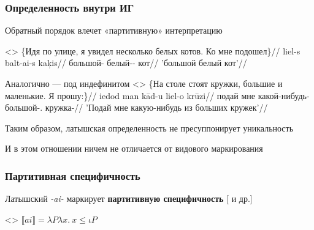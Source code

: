 \documentclass[9pt, t]{beamer}
\begin{document}
\begin{frame}
    \frametitle{Определенность внутри ИГ}

    Обратный порядок влечет «партитивную» интерпретацию

    \ex<>
        \begingl
            \glpreamble \{Идя по улице, я увидел несколько белых котов. Ко мне подошел\}//
            \gla liel-s balt-ai-s kaķis//
            \glb большой-\Nom{} белый-\Def-\Nom{} кот//
            \glft 'большой белый кот'//
        \endgl
    \xe

    \pause
    Аналогично — под индефинитом
    \ex<>
        \begingl
            \glpreamble \{На столе стоят кружки, большие и маленькие. Я прошу:\}//
            \gla iedod man kād-u liel-o krūzi//
            \glb подай мне какой-нибудь-\Acc{} большой-\Def{}.\Acc{} кружка-\Acc{}//
            \glft 'Подай мне какую-нибудь из больших кружек'//
        \endgl
    \xe

    \pause
    Таким образом, латышская определенность не пресуппонирует уникальность

    И в этом отношении ничем не отличается от видового маркирования

\end{frame}

\begin{frame}[c]
    \frametitle{Партитивная специфичность}

    Латышский \textit{-ai-} маркирует \textbf{партитивную специфичность} [\citealt{enc1991} и др.]

    \ex<>
        $\llbracket ai \rrbracket = \lambda P\lambda x.\ x\le \iota P$
    \xe

    \pause
    

\end{frame}
\end{document}

